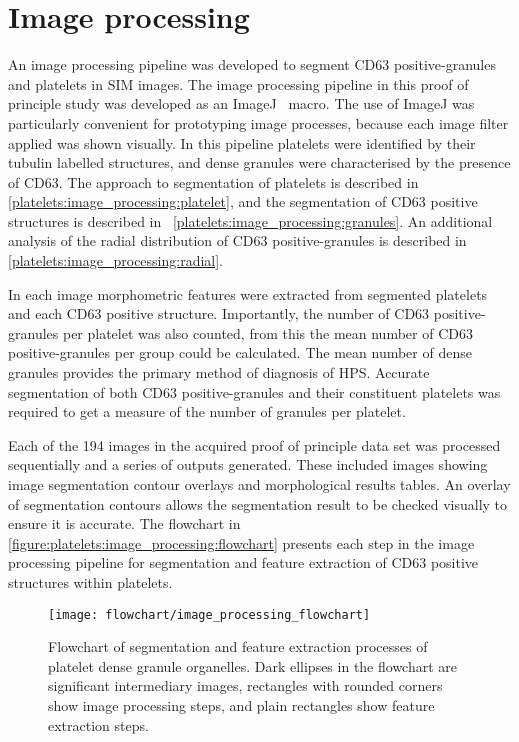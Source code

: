 \section{Image processing}
\label{platelets:image_processing}
An image processing pipeline was developed to segment CD63 positive-granules and platelets in SIM images. The image processing pipeline in this proof of principle study was developed as an ImageJ~\cite{Schneider2012} macro. The use of ImageJ was particularly convenient for prototyping image processes, because each image filter applied was shown visually. In this pipeline platelets were identified by their tubulin labelled structures, and dense granules were characterised by the presence of CD63. The approach to segmentation of platelets is described in \autoref{platelets:image_processing:platelet}, and the segmentation of CD63 positive structures is described in ~\autoref{platelets:image_processing:granules}. An additional analysis of the radial distribution of CD63 positive-granules is described in \autoref{platelets:image_processing:radial}.

In each image morphometric features were extracted from segmented platelets and each CD63 positive structure. Importantly, the number of CD63 positive-granules per platelet was also counted, from this the mean number of CD63 positive-granules per group could be calculated. The mean number of dense granules provides the primary method of diagnosis of HPS. Accurate segmentation of both CD63 positive-granules and their constituent platelets was required to get a measure of the number of granules per platelet.

Each of the 194 images in the acquired proof of principle data set was processed sequentially and a series of outputs generated. These included images showing image segmentation contour overlays and morphological results tables. An overlay of segmentation contours allows the segmentation result to be checked visually to ensure it is accurate. The flowchart in \autoref{figure:platelets:image_processing:flowchart} presents each step in the image processing pipeline for segmentation and feature extraction of CD63 positive structures within platelets.

\begin{figure}[htbp]
	\centering
	\texttt{[image: flowchart/image\_processing\_flowchart]}
	\caption[Flowchart of segmentation processes of endothelial platelets]{Flowchart of segmentation and feature extraction processes of platelet dense granule organelles. Dark ellipses in the flowchart are significant intermediary images, rectangles with rounded corners show image processing steps, and plain rectangles show feature extraction steps.}
	\label{figure:platelets:image_processing:flowchart}
\end{figure}

